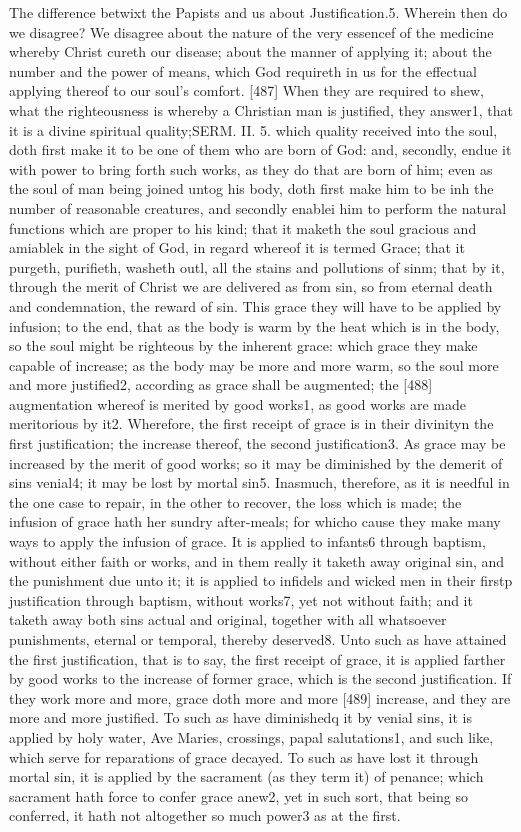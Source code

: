 The difference betwixt the Papists and us about Justification.5. Wherein then do we disagree? We disagree about the nature of the very essencef of the medicine whereby Christ cureth our disease; about the manner of applying it; about the number and the power of means, which God requireth in us for the effectual applying thereof to our soul’s comfort. [487] When they are required to shew, what the righteousness is whereby a Christian man is justified, they answer1, that it is a divine spiritual quality;SERM. II. 5. which quality received into the soul, doth first make it to be one of them who are born of God: and, secondly, endue it with power to bring forth such works, as they do that are born of him; even as the soul of man being joined untog his body, doth first make him to be inh the number of reasonable creatures, and secondly enablei him to perform the natural functions which are proper to his kind; that it maketh the soul gracious and amiablek in the sight of God, in regard whereof it is termed Grace; that it purgeth, purifieth, washeth outl, all the stains and pollutions of sinm; that by it, through the merit of Christ we are delivered as from sin, so from eternal death and condemnation, the reward of sin. This grace they will have to be applied by infusion; to the end, that as the body is warm by the heat which is in the body, so the soul might be righteous by the inherent grace: which grace they make capable of increase; as the body may be more and more warm, so the soul more and more justified2, according as grace shall be augmented; the [488] augmentation whereof is merited by good works1, as good works are made meritorious by it2. Wherefore, the first receipt of grace is in their divinityn the first justification; the increase thereof, the second justification3. As grace may be increased by the merit of good works; so it may be diminished by the demerit of sins venial4; it may be lost by mortal sin5. Inasmuch, therefore, as it is needful in the one case to repair, in the other to recover, the loss which is made; the infusion of grace hath her sundry after-meals; for whicho cause they make many ways to apply the infusion of grace. It is applied to infants6 through baptism, without either faith or works, and in them really it taketh away original sin, and the punishment due unto it; it is applied to infidels and wicked men in their firstp justification through baptism, without works7, yet not without faith; and it taketh away both sins actual and original, together with all whatsoever punishments, eternal or temporal, thereby deserved8. Unto such as have attained the first justification, that is to say, the first receipt of grace, it is applied farther by good works to the increase of former grace, which is the second justification. If they work more and more, grace doth more and more [489] increase, and they are more and more justified. To such as have diminishedq it by venial sins, it is applied by holy water, Ave Maries, crossings, papal salutations1, and such like, which serve for reparations of grace decayed. To such as have lost it through mortal sin, it is applied by the sacrament (as they term it) of penance; which sacrament hath force to confer grace anew2, yet in such sort, that being so conferred, it hath not altogether so much power3 as at the first. 